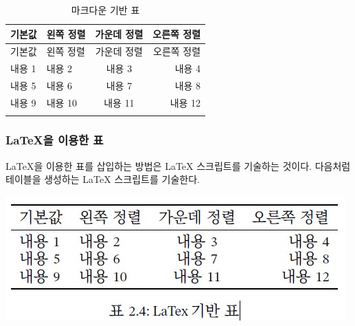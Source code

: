 \documentclass[
  letterpaper,
]{book}
\begin{document}
\begin{longtable}[]{@{}llcr@{}}
\toprule\noalign{}
기본값 & 왼쪽 정렬 & 가운데 정렬 & 오른쪽 정렬 \\
\midrule\noalign{}
\endfirsthead
\toprule\noalign{}
기본값 & 왼쪽 정렬 & 가운데 정렬 & 오른쪽 정렬 \\
\midrule\noalign{}
\endhead
\bottomrule\noalign{}
\endlastfoot
내용 1 & 내용 2 & 내용 3 & 내용 4 \\
내용 5 & 내용 6 & 내용 7 & 내용 8 \\
내용 9 & 내용 10 & 내용 11 & 내용 12 \\
\caption{마크다운 기반 표}\tabularnewline
\end{longtable}

\hypertarget{latexuxc744-uxc774uxc6a9uxd55c-uxd45c}{%
\subsubsection{LaTeX을 이용한
표}\label{latexuxc744-uxc774uxc6a9uxd55c-uxd45c}}

LaTeX을 이용한 표를 삽입하는 방법은 LaTeX 스크립트를 기술하는 것이다.
다음처럼 테이블을 생성하는 LaTeX 스크립트를 기술한다.

\includegraphics{images/table_latex.jpg}
\end{document}
